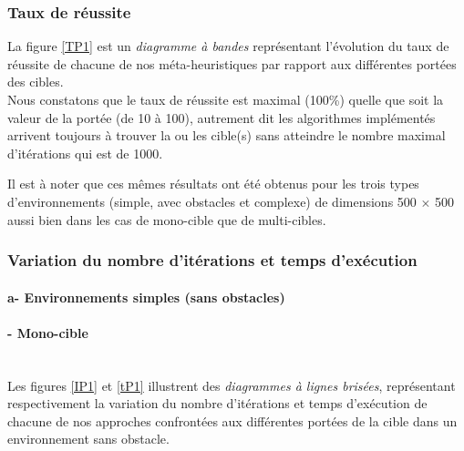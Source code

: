 	\noindent
	\begin{minipage}[t]{0.5\textwidth}
		\subsubsection{Taux de réussite}
		
		La figure \ref{TP1} est un \textit{diagramme à bandes} représentant l'évolution du taux de réussite de chacune de nos méta-heuristiques par rapport aux différentes portées des cibles.\\
		
		Nous constatons que le taux de réussite est maximal (100\%) quelle que soit la valeur de la portée (de 10 à 100), autrement dit les algorithmes	implémentés arrivent toujours à trouver la ou les cible(s) sans atteindre le nombre maximal d'itérations qui est de 1000.
		
		Il est à noter que ces mêmes résultats ont été obtenus pour les trois types d'environnements (simple, avec obstacles et complexe) de dimensions 500 $\times$ 500 aussi bien dans les cas de mono-cible que de multi-cibles. 	
	\end{minipage}\hfill
	\begin{minipage}[t]{0.55\textwidth}
		\vspace{0.3cm}
		\captionsetup{width=0.8\linewidth}
		\centering{}
		\vspace{-0.3cm}
		\label{TP1}
	\end{minipage}\hfill
	
	
	\subsubsection{Variation du nombre d'itérations et temps d'exécution}
	\paragraph{a- Environnements simples (sans obstacles)}
	\paragraph{- Mono-cible}
	\vspace{-0.3cm}
	\textbf{ }\\
	Les figures \ref{IP1} et \ref{tP1} illustrent des \textit{diagrammes à lignes brisées}, représentant respectivement la variation du nombre d'itérations et temps d'exécution de chacune de nos approches confrontées aux différentes portées de la cible dans un environnement sans obstacle.\\
	\vspace{-0.2cm}
	
